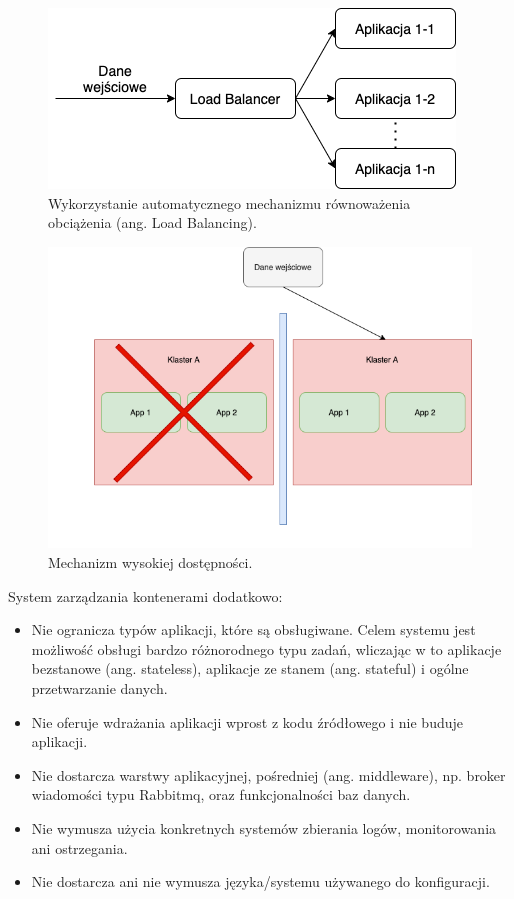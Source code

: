 \begin{figure}[!ht]
\centering
\includegraphics[width=.8\textwidth]{Chapters/Rozwiazanie/k8s/lb.png}
\caption{Wykorzystanie automatycznego mechanizmu równoważenia obciążenia (ang. Load Balancing).}
\label{fig:chapter3:lb}
\end{figure}

\begin{figure}[!ht]
\centering
\includegraphics[width=.8\textwidth]{Chapters/Rozwiazanie/k8s/ha.png}
\caption{Mechanizm wysokiej dostępności.}
\label{fig:chapter3:ha}
\end{figure}

System zarządzania kontenerami dodatkowo:
\begin{itemize}
    \item Nie ogranicza typów aplikacji, które są obsługiwane. Celem systemu jest możliwość obsługi bardzo różnorodnego typu zadań, wliczając w to aplikacje bezstanowe (ang. stateless), aplikacje ze stanem (ang. stateful) i ogólne przetwarzanie danych.
    \item Nie oferuje wdrażania aplikacji wprost z kodu źródłowego i nie buduje aplikacji.
    \item Nie dostarcza warstwy aplikacyjnej, pośredniej (ang. middleware), np. broker wiadomości typu Rabbitmq, oraz funkcjonalności baz danych.
    \item Nie wymusza użycia konkretnych systemów zbierania logów, monitorowania ani ostrzegania.
    \item Nie dostarcza ani nie wymusza języka/systemu używanego do konfiguracji.
\end{itemize}

